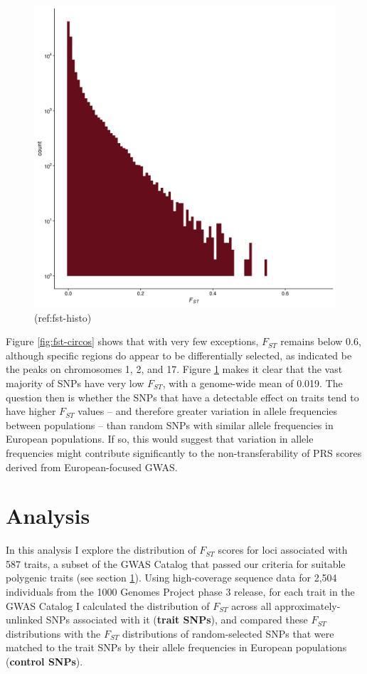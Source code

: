 \documentclass[
]{book}
\begin{document}
\begin{figure}
\includegraphics[width=1\linewidth]{figs/fst/histo_fst_all} \caption{(ref:fst-histo)}\label{fig:fst-histo}
\end{figure}

Figure \ref{fig:fst-circos} shows that with very few exceptions, \(F_{ST}\) remains below 0.6, although specific regions do appear to be differentially selected, as indicated be the peaks on chromosomes 1, 2, and 17. Figure \ref{fig:fst-histo} makes it clear that the vast majority of SNPs have very low \(F_{ST}\), with a genome-wide mean of 0.019. The question then is whether the SNPs that have a detectable effect on traits tend to have higher \(F_{ST}\) values -- and therefore greater variation in allele frequencies between populations -- than random SNPs with similar allele frequencies in European populations. If so, this would suggest that variation in allele frequencies might contribute significantly to the non-transferability of PRS scores derived from European-focused GWAS.

\hypertarget{Fst-analysis-chap}{%
\section{Analysis}\label{Fst-analysis-chap}}

In this analysis I explore the distribution of \(F_{ST}\) scores for loci associated with 587 traits, a subset of the GWAS Catalog that passed our criteria for suitable polygenic traits (see section \ref{Fst-analysis-chap}). Using high-coverage sequence data for 2,504 individuals from the 1000 Genomes Project phase 3 release, for each trait in the GWAS Catalog I calculated the distribution of \(F_{ST}\) across all approximately-unlinked SNPs associated with it (\textbf{trait SNPs}), and compared these \(F_{ST}\) distributions with the \(F_{ST}\) distributions of random-selected SNPs that were matched to the trait SNPs by their allele frequencies in European populations (\textbf{control SNPs}).
\end{document}
